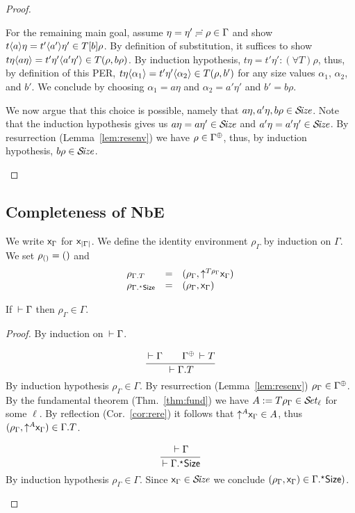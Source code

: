 \documentclass[acmlarge,review,anonymous]{acmart}\settopmatter{printfolios=true}
\begin{document}
\begin{proof}
\begin{caselist}
For the remaining main goal,
assume $\eta = \eta' \eeq \rho \in \Gamma$ and
show $t \ann a \eta = t' \ann{a'} \eta' \in T[b]\rho$.
By definition of substitution, it suffices to show
$t \eta \ann{a \eta} = t' \eta' \ann{a' \eta'} \in T(\rho, b \rho)$.
By induction hypothesis,
$t \eta = t' \eta' : (\forall T) \rho$, thus, by definition of this PER,
$t \eta \ann {\alpha_1} = t' \eta' \ann{\alpha_2} \in T(\rho, b')$ for any size values $\alpha_1$, $\alpha_2$, and $b'$.
We conclude by choosing $\alpha_1 = a \eta$ and $\alpha_2 = a' \eta'$ and $b' = b \rho$.

We now argue that this choice is possible,
namely that $a \eta, a'\eta, b\rho \in \SIZE$.
Note that the induction hypothesis gives us
$a \eta  = a  \eta' \in \SIZE$ and
$a' \eta = a' \eta' \in \SIZE$.
By resurrection (Lemma~\ref{lem:resenv}) we have $\rho \in \resurrect\Gamma$,
thus, by induction hypothesis, $b \rho \in \SIZE$.
\end{caselist}
\end{proof}


\subsection{Completeness of NbE}
\label{sec:compl}

We write $\var\Gamma$ for $\var{|\Gamma|}$.
We define the identity environment $\rho_\Gamma$ by induction on $\Gamma$.
We set $\rho_{\cempty} = \sempty$ and
\[
\begin{array}{lll}
  \rho_{\cext \Gamma T} & = & (\rho_\Gamma, \up{T\rho_\Gamma} \var\Gamma) \\
  \rho_{\eext \Gamma \Size} & = & (\rho_\Gamma, \var\Gamma) \\
\end{array}
\]
\begin{lemma}
  If $\der \Gamma$ then
  $\rho_\Gamma \in \Gamma$.
\end{lemma}
\begin{proof}
By induction on $\der \Gamma$.
\begin{caselist}

\nextcase
\[
  \ru{\der \Gamma \qquad \resurrect\Gamma \der T
    }{\der \cext\Gamma T}
\]
By induction hypothesis $\rho_\Gamma \in \Gamma$.
By resurrection (Lemma~\ref{lem:resenv}) $\rho_\Gamma \in \resurrect\Gamma$.
By the fundamental theorem (Thm.~\ref{thm:fund}) we have $A := T\rho_\Gamma \in \SET[\ell]$ for some $\ell$.
By reflection (Cor.~\ref{cor:rere}) it follows that $\up A \var\Gamma \in A$, thus
$(\rho_\Gamma, \up A \var\Gamma) \in \cext \Gamma T$.

\nextcase
\[
  \ru{\der \Gamma
    }{\der \eext\Gamma \Size}
\]
By induction hypothesis $\rho_\Gamma \in \Gamma$.  Since $\var\Gamma \in \SIZE$ we conclude
$(\rho_\Gamma, \var\Gamma) \in \eext\Gamma \Size)$.
\end{caselist}
\end{proof}
\end{document}

